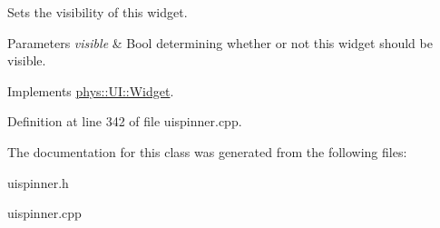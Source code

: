 Sets the visibility of this widget. 


\begin{DoxyParams}{Parameters}
{\em visible} & Bool determining whether or not this widget should be visible. \\
\hline
\end{DoxyParams}


Implements \hyperlink{classphys_1_1UI_1_1Widget_ab049233d8d5522a6ab42654b8924a3e0}{phys::UI::Widget}.



Definition at line 342 of file uispinner.cpp.



The documentation for this class was generated from the following files:\begin{DoxyCompactItemize}
\item 
uispinner.h\item 
uispinner.cpp\end{DoxyCompactItemize}
